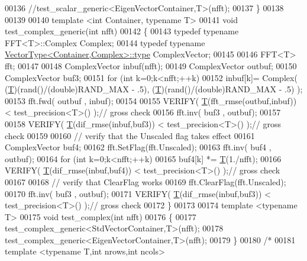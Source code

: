 \begin{DoxyCode}
00136   \textcolor{comment}{//test\_scalar\_generic<EigenVectorContainer,T>(nfft);}
00137 \}
00138 
00139 
00140 \textcolor{keyword}{template} <\textcolor{keywordtype}{int} Container, \textcolor{keyword}{typename} T>
00141 \textcolor{keywordtype}{void} test\_complex\_generic(\textcolor{keywordtype}{int} nfft)
00142 \{
00143     \textcolor{keyword}{typedef} \textcolor{keyword}{typename} FFT<T>::Complex Complex;
00144     \textcolor{keyword}{typedef} \textcolor{keyword}{typename} \hyperlink{struct_vector_type}{VectorType<Container,Complex>::type} ComplexVector;
00145 
00146     FFT<T> fft;
00147 
00148     ComplexVector inbuf(nfft);
00149     ComplexVector outbuf;
00150     ComplexVector buf3;
00151     \textcolor{keywordflow}{for} (\textcolor{keywordtype}{int} k=0;k<nfft;++k)
00152         inbuf[k]= Complex( (\hyperlink{group___sparse_core___module}{T})(rand()/(\textcolor{keywordtype}{double})RAND\_MAX - .5), (\hyperlink{group___sparse_core___module}{T})(rand()/(\textcolor{keywordtype}{double})RAND\_MAX - .5) );
00153     fft.fwd( outbuf , inbuf);
00154 
00155     VERIFY( \hyperlink{group___sparse_core___module}{T}(fft\_rmse(outbuf,inbuf)) < test\_precision<T>()  );\textcolor{comment}{// gross check}
00156     fft.inv( buf3 , outbuf);
00157 
00158     VERIFY( \hyperlink{group___sparse_core___module}{T}(dif\_rmse(inbuf,buf3)) < test\_precision<T>()  );\textcolor{comment}{// gross check}
00159 
00160     \textcolor{comment}{// verify that the Unscaled flag takes effect}
00161     ComplexVector buf4;
00162     fft.SetFlag(fft.Unscaled);
00163     fft.inv( buf4 , outbuf);
00164     \textcolor{keywordflow}{for} (\textcolor{keywordtype}{int} k=0;k<nfft;++k)
00165         buf4[k] *= \hyperlink{group___sparse_core___module}{T}(1./nfft);
00166     VERIFY( \hyperlink{group___sparse_core___module}{T}(dif\_rmse(inbuf,buf4)) < test\_precision<T>()  );\textcolor{comment}{// gross check}
00167 
00168     \textcolor{comment}{// verify that ClearFlag works}
00169     fft.ClearFlag(fft.Unscaled);
00170     fft.inv( buf3 , outbuf);
00171     VERIFY( \hyperlink{group___sparse_core___module}{T}(dif\_rmse(inbuf,buf3)) < test\_precision<T>()  );\textcolor{comment}{// gross check}
00172 \}
00173 
00174 \textcolor{keyword}{template} <\textcolor{keyword}{typename} T>
00175 \textcolor{keywordtype}{void} test\_complex(\textcolor{keywordtype}{int} nfft)
00176 \{
00177   test\_complex\_generic<StdVectorContainer,T>(nfft);
00178   test\_complex\_generic<EigenVectorContainer,T>(nfft);
00179 \}
00180 \textcolor{comment}{/*}
00181 \textcolor{comment}{template <typename T,int nrows,int ncols>}

\end{DoxyCode}
